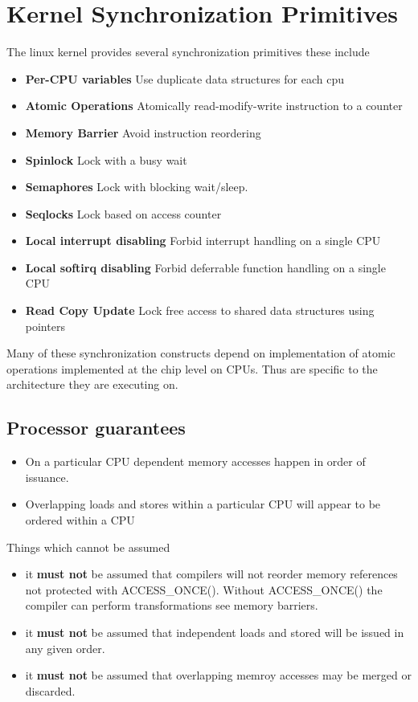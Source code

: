 \documentclass{article}
\begin{document}
\section{Kernel Synchronization Primitives}

The linux kernel provides several synchronization primitives these
include

\begin{itemize}
\item \textbf{Per-CPU variables}
  Use duplicate data structures for each cpu
\item \textbf{Atomic Operations}
  Atomically read-modify-write instruction to a counter
\item \textbf{Memory Barrier}
  Avoid instruction reordering
\item  \textbf{Spinlock}
  Lock with a busy wait
\item \textbf{Semaphores}
  Lock with blocking wait/sleep.
\item \textbf{Seqlocks}
  Lock based on access counter
\item \textbf{Local interrupt disabling}
  Forbid interrupt handling on a single CPU
\item \textbf{Local softirq disabling}
  Forbid deferrable function handling on a single CPU
\item \textbf{Read Copy Update}
  Lock free access to shared data structures using pointers
\end{itemize}

Many of these synchronization constructs depend on implementation of
atomic operations implemented at the chip level on CPUs. Thus are
specific to the architecture they are executing on.

\subsection{Processor guarantees}

\begin{itemize}
  \item On a particular CPU dependent memory accesses happen in order
    of issuance.

  \item Overlapping loads and stores within a particular CPU will
    appear to be ordered within a CPU
    
\end{itemize}

Things which cannot be assumed

\begin{itemize}
\item it \textbf{must not} be assumed that compilers will not reorder
  memory references not protected with ACCESS\_ONCE(). Without
  ACCESS\_ONCE() the compiler can perform transformations see memory
  barriers.
\item it \textbf{must not} be assumed that independent loads and
  stored will be issued in any given order.
\item it \textbf{must not} be assumed that overlapping memroy accesses
  may be merged or discarded.  
\end{itemize}
\end{document}
